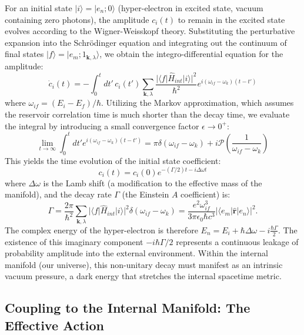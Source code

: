 For an initial state $|i\rangle = |e_n; 0\rangle$ (hyper-electron in excited state, vacuum containing zero photons), the amplitude $c_i(t)$ to remain in the excited state evolves according to the Wigner-Weisskopf theory. Substituting the perturbative expansion into the Schrödinger equation and integrating out the continuum of final states $|f\rangle = |e_m; 1_{\mathbf{k},\lambda}\rangle$, we obtain the integro-differential equation for the amplitude:
\begin{equation}
    \dot{c}_i(t) = - \int_0^t dt' \, c_i(t') \sum_{\mathbf{k},\lambda} \frac{|\langle f | \hat{H}_{int} | i \rangle|^2}{\hbar^2} e^{i(\omega_{if} - \omega_k)(t - t')}
\end{equation}
where $\omega_{if} = (E_i - E_f)/\hbar$. Utilizing the Markov approximation, which assumes the reservoir correlation time is much shorter than the decay time, we evaluate the integral by introducing a small convergence factor $\epsilon \to 0^+$:
\begin{equation}
    \lim_{t \to \infty} \int_0^t dt' e^{i(\omega_{if} - \omega_k)(t - t')} = \pi \delta(\omega_{if} - \omega_k) + i \mathcal{P} \left( \frac{1}{\omega_{if} - \omega_k} \right)
\end{equation}
This yields the time evolution of the initial state coefficient:
\begin{equation}
    c_i(t) = c_i(0) e^{-(\Gamma/2) t - i \Delta \omega t}
\end{equation}
where $\Delta \omega$ is the Lamb shift (a modification to the effective mass of the manifold), and the decay rate $\Gamma$ (the Einstein $A$ coefficient) is:
\begin{equation}
    \Gamma = \frac{2\pi}{\hbar^2} \sum_{\mathbf{k},\lambda} |\langle f | \hat{H}_{int} | i \rangle|^2 \delta(\omega_{if} - \omega_k) = \frac{e^2 \omega_{if}^3}{3 \pi \epsilon_0 \hbar c^3} |\langle e_m | \hat{\mathbf{r}} | e_n \rangle|^2.
\end{equation}
The complex energy of the hyper-electron is therefore $E_n = E_i + \hbar \Delta \omega - i \frac{\hbar \Gamma}{2}$. The existence of this imaginary component $-i\hbar\Gamma/2$ represents a continuous leakage of probability amplitude into the external environment. Within the internal manifold (our universe), this non-unitary decay must manifest as an intrinsic vacuum pressure, a dark energy that stretches the internal spacetime metric.

\subsection{Coupling to the Internal Manifold: The Effective Action}

